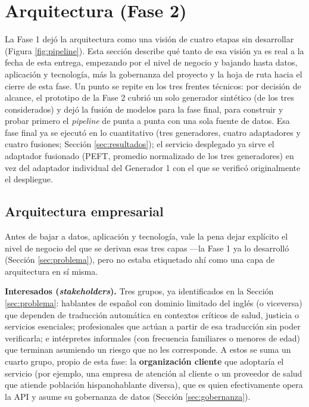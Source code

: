 \documentclass[11pt,a4paper]{article}
\begin{document}
\section{Arquitectura (Fase 2)}
\label{sec:arquitectura}

La Fase 1 dejó la arquitectura como una visión de cuatro etapas sin desarrollar (Figura \ref{fig:pipeline}). Esta sección describe qué tanto de esa visión ya es real a la fecha de esta entrega, empezando por el nivel de negocio y bajando hasta datos, aplicación y tecnología, más la gobernanza del proyecto y la hoja de ruta hacia el cierre de esta fase. Un punto se repite en los tres frentes técnicos: por decisión de alcance, el prototipo de la Fase 2 cubrió un solo generador sintético (de los tres considerados) y dejó la fusión de modelos para la fase final, para construir y probar primero el \textit{pipeline} de punta a punta con una sola fuente de datos. Esa fase final ya se ejecutó en lo cuantitativo (tres generadores, cuatro adaptadores y cuatro fusiones; Sección \ref{sec:resultados}); el servicio desplegado ya sirve el adaptador fusionado (PEFT, promedio normalizado de los tres generadores) en vez del adaptador individual del Generador 1 con el que se verificó originalmente el despliegue.

\subsection{Arquitectura empresarial}
\label{sec:arquitectura-empresarial}

Antes de bajar a datos, aplicación y tecnología, vale la pena dejar explícito el nivel de negocio del que se derivan esas tres capas —la Fase 1 ya lo desarrolló (Sección \ref{sec:problema}), pero no estaba etiquetado ahí como una capa de arquitectura en sí misma.

\textbf{Interesados (\textit{stakeholders}).} Tres grupos, ya identificados en la Sección \ref{sec:problema}: hablantes de español con dominio limitado del inglés (o viceversa) que dependen de traducción automática en contextos críticos de salud, justicia o servicios esenciales; profesionales que actúan a partir de esa traducción sin poder verificarla; e intérpretes informales (con frecuencia familiares o menores de edad) que terminan asumiendo un riesgo que no les corresponde. A estos se suma un cuarto grupo, propio de esta fase: la \textbf{organización cliente} que adoptaría el servicio (por ejemplo, una empresa de atención al cliente o un proveedor de salud que atiende población hispanohablante diversa), que es quien efectivamente opera la API y asume su gobernanza de datos (Sección \ref{sec:gobernanza}).
\end{document}
